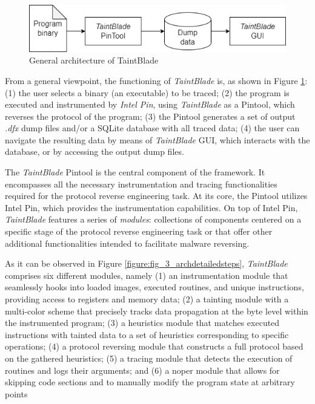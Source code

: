 \documentclass[conference]{IEEEtran}
\begin{document}
\begin{figure}[htbp]
    \centerline{\includegraphics[width=0.9\columnwidth]{images/generalarch.drawio.png}}
    \caption{General architecture of TaintBlade}
    \label{fig_3_generalarch}
\end{figure}

From a general viewpoint, the functioning of \textit{TaintBlade} is, as shown
in Figure \ref{fig_3_generalarch}: (1) the user selects a binary (an
executable) to be traced; (2) the program is executed and instrumented by
\textit{Intel Pin}, using \textit{TaintBlade} as a Pintool, which reverses the
protocol of the program; (3) the Pintool generates a set of output
\textit{.dfx} dump files and/or a SQLite database with all traced data; (4) the
user can navigate the resulting data by means of \textit{TaintBlade} GUI, which
interacts with the database, or by accessing the output dump files.

The \textit{TaintBlade} Pintool is the central component of the framework. It
encompasses all the necessary instrumentation and tracing functionalities
required for the protocol reverse engineering task. At its core, the Pintool
utilizes Intel Pin, which provides the instrumentation capabilities. On top of
Intel Pin, \textit{TaintBlade} features a series of \textit{modules}:
collections of components centered on a specific stage of the protocol reverse
engineering task or that offer other additional functionalities intended to
facilitate malware reversing.

As it can be observed in Figure \ref{figure:fig_3_archdetailedsteps},
\textit{TaintBlade} comprises six different modules, namely (1) an
instrumentation module that seamlessly hooks into loaded images, executed
routines, and unique instructions, providing access to registers and memory
data; (2) a tainting module with a multi-color scheme that precisely tracks
data propagation at the byte level within the instrumented program; (3) a
heuristics module that matches executed instructions with tainted data to a set
of heuristics corresponding to specific operations; (4) a protocol reversing
module that constructs a full protocol based on the gathered heuristics; (5) a
tracing module that detects the execution of routines and logs their arguments;
and (6) a noper module that allows for skipping code sections and to manually
modify the program state at arbitrary points
\end{document}
